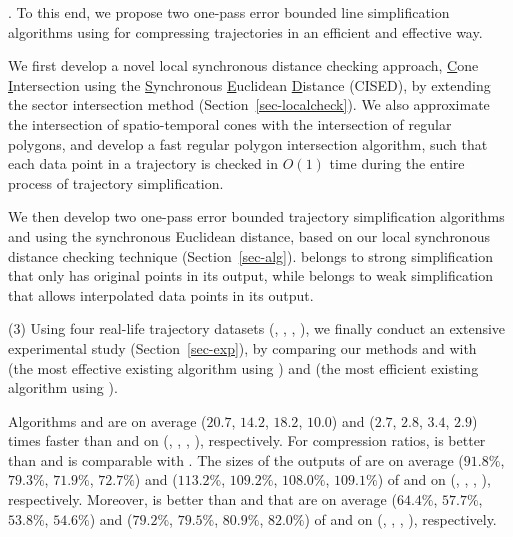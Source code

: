 .
To this end, we propose two one-pass error bounded line simplification algorithms using \sed for compressing trajectories in an efficient and effective way.

 We first develop a novel local synchronous distance checking approach, \ie \underline{C}one \underline{I}ntersection using the \underline{S}ynchronous \underline{E}uclidean \underline{D}istance (CISED), by extending the sector intersection method \cite{Williams:Longest, Sklansky:Cone, Zhao:Sleeve} (Section~\ref{sec-localcheck}). We also approximate the intersection of spatio-temporal cones with the intersection of regular polygons, and develop a fast regular polygon intersection algorithm, such that each data point in a trajectory is checked in $O(1)$ time during the entire process of trajectory simplification.

 We then develop two one-pass error bounded trajectory simplification algorithms \cist and \cista using the synchronous Euclidean distance, based on
our local synchronous distance checking technique (Section~\ref{sec-alg}). \cist belongs to strong simplification that only has original points in its output, while \cista belongs to weak simplification that allows interpolated data points in its output.


\sstab (3) Using four real-life trajectory datasets (\truck, \sercar, \geolife, \pricar),
we finally conduct an extensive experimental study (Section~\ref{sec-exp}), by comparing our methods \cist and \cista with \dps~\cite{Meratnia:Spatiotemporal} (the most effective existing \lsa algorithm using \sed) and \squishe \cite{Muckell:Compression} (the most efficient existing \lsa algorithm using \sed).

Algorithms \cist and \cista are on average ($20.7$, $14.2$, $18.2$, $10.0$) and ($2.7$, $2.8$, $3.4$, {$2.9$}) times faster than \dps and \squishe on (\truck, \sercar, \geolife, \pricar), respectively.
%
For compression ratios, \cist is better than \squishe and is comparable with \dps. The sizes of the outputs of \cist are on average ($91.8\%$, $79.3\%$, $71.9\%$, {$72.7\%$}) and ($113.2\%$, $109.2\%$, $108.0\%$, $109.1\%$) of \squishe and \dps on (\truck, \sercar, \geolife, \pricar), respectively. Moreover, \cista is better than \squishe and \dps that are on average ($64.4\%$, $57.7\%$, $53.8\%$, {$54.6\%$}) and ($79.2\%$, $79.5\%$, $80.9\%$, $82.0\%$) of \squishe and \dps on (\truck, \sercar, \geolife, \pricar), respectively.






